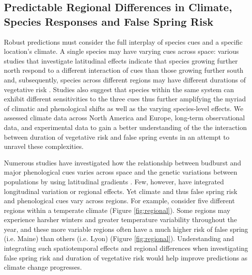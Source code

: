 \documentclass{article}\usepackage[]{graphicx}\usepackage[]{color}
\begin{document}

\subsection {Predictable Regional Differences in Climate, Species Responses and False Spring Risk}
Robust predictions must consider the full interplay of species cues and a specific location's climate. A single species may have varying cues across space: various studies that investigate latitudinal effects indicate that species growing further north respond to a different interaction of cues than those growing further south and, subsequently, species across different regions may have different durations of vegetative risk \citep {Partanen2004, Viheraaarnio2006, Caffarra2011}. Studies also suggest that species within the same system can exhibit different sensitivities to the three cues \citep{Basler2012, Laube2013} thus further amplifying the myriad of climatic and phenological shifts as well as the varying species-level effects.  We assessed climate data across North America and Europe, long-term observational data, and experimental data to gain a better understanding of the the interaction between duration of vegetative risk and false spring events in an attempt to unravel these complexities.

Numerous studies have investigated how the relationship between budburst and major phenological cues varies across space and the genetic variations between populations by using latitudinal gradients \citep{Partanen2004, Viheraaarnio2006, Caffarra2011, Zohner2016, Gauzere2017}. Few, however, have integrated longitudinal variation or regional effects. Yet climate and thus false spring risk and phenological cues vary across regions. For example, consider five different regions within a temperate climate (Figure \ref{fig:regional}). Some regions may experience harsher winters and greater temperature variability throughout the year, and these more variable regions often have a much higher risk of false spring (i.e. Maine) than others (i.e. Lyon) (Figure \ref{fig:regional}). Understanding and integrating such spatiotemporal effects and regional differences when investigating false spring risk and duration of vegetative risk would help improve predictions as climate change progresses.
\end{document}
